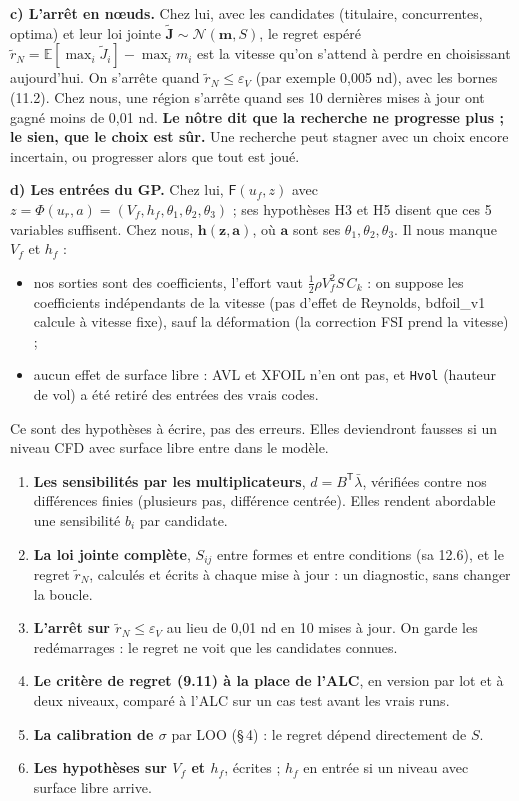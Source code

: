 \documentclass[11pt,a4paper]{article}
\newcommand{\vz}{\bm{z}}
\newcommand{\va}{\bm{a}}
\newcommand{\vh}{\bm{h}}
\newcommand{\py}[1]{\texttt{#1}}
\newcommand{\F}{\mathsf{F}}
\newcommand{\tp}{^{\mathsf{T}}}
\begin{document}
\textbf{c) L'arrêt en nœuds.} Chez lui, avec les candidates (titulaire, concurrentes, optima) et leur loi
jointe $\tilde{\bm J}\sim\mathcal N(\bm m,S)$, le regret espéré $\tilde r_N=\mathbb E[\max_i\tilde J_i]-\max_i m_i$
est la vitesse qu'on s'attend à perdre en choisissant aujourd'hui. On s'arrête quand $\tilde r_N\le\varepsilon_V$
(par exemple 0,005 nd), avec les bornes (11.2). Chez nous, une région s'arrête quand ses 10 dernières mises à
jour ont gagné moins de 0,01 nd. \textbf{Le nôtre dit que la recherche ne progresse plus ; le sien, que le choix
est sûr.} Une recherche peut stagner avec un choix encore incertain, ou progresser alors que tout est joué.

\textbf{d) Les entrées du GP.} Chez lui, $\F(u_f,z)$ avec $z=\Phi(u_r,a)=(V_f,h_f,\theta_1,\theta_2,\theta_3)$ ; ses
hypothèses H3 et H5 disent que ces 5 variables suffisent. Chez nous, $\vh(\vz,\va)$, où $\va$ sont ses
$\theta_1,\theta_2,\theta_3$. Il nous manque $V_f$ et $h_f$ :
\begin{itemize}
  \item nos sorties sont des coefficients, l'effort vaut $\tfrac12\rho V_f^2 S\,C_k$ : on suppose les
        coefficients indépendants de la vitesse (pas d'effet de Reynolds, bdfoil\_v1 calcule à vitesse fixe),
        sauf la déformation (la correction FSI prend la vitesse) ;
  \item aucun effet de surface libre : AVL et XFOIL n'en ont pas, et \py{Hvol} (hauteur de vol) a été retiré
        des entrées des vrais codes.
\end{itemize}
Ce sont des hypothèses à écrire, pas des erreurs. Elles deviendront fausses si un niveau CFD avec surface libre
entre dans le modèle.

\begin{adire}
\begin{enumerate}
  \item \textbf{Les sensibilités par les multiplicateurs}, $d=B\tp\bar\lambda$, vérifiées contre nos différences
        finies (plusieurs pas, différence centrée). Elles rendent abordable une sensibilité $b_i$ par candidate.
  \item \textbf{La loi jointe complète}, $S_{ij}$ entre formes et entre conditions (sa 12.6), et le regret
        $\tilde r_N$, calculés et écrits à chaque mise à jour : un diagnostic, sans changer la boucle.
  \item \textbf{L'arrêt sur $\tilde r_N\le\varepsilon_V$} au lieu de 0,01 nd en 10 mises à jour. On garde les
        redémarrages : le regret ne voit que les candidates connues.
  \item \textbf{Le critère de regret (9.11) à la place de l'ALC}, en version par lot et à deux niveaux, comparé
        à l'ALC sur un cas test avant les vrais runs.
  \item \textbf{La calibration de $\sigma$} par LOO (§\,4) : le regret dépend directement de $S$.
  \item \textbf{Les hypothèses sur $V_f$ et $h_f$}, écrites ; $h_f$ en entrée si un niveau avec surface libre
        arrive.
\end{enumerate}
\end{adire}
\end{document}
